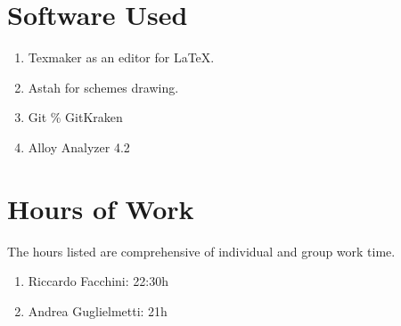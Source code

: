 \section{Software Used}
\begin{enumerate}
\item Texmaker as an editor for \LaTeX.
\item Astah for schemes drawing.
\item Git \% GitKraken
\item Alloy Analyzer 4.2
\end{enumerate}
\section{Hours of Work}
The hours listed are comprehensive of individual and group work time.
\begin{enumerate}
\item Riccardo Facchini: 22:30h
\item Andrea Guglielmetti: 21h
\end{enumerate}